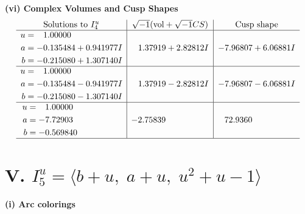 \documentclass[1p]{elsarticle_modified}
\theoremstyle{definition}
\newcommand{\I}{\sqrt{-1}}
\begin{document}
\newpage\flushleft \textbf{(vi) Complex Volumes and Cusp Shapes}
$$\begin{array}{c|c|c}  
\text{Solutions to }I^u_{4}& \I (\text{vol} + \sqrt{-1}CS) & \text{Cusp shape}\\
 \hline 
\begin{aligned}
u &= \phantom{-}1.00000\phantom{ +0.000000I} \\
a &= -0.135484 + 0.941977 I \\
b &= -0.215080 + 1.307140 I\end{aligned}
 & \phantom{-}1.37919 + 2.82812 I & -7.96807 + 6.06881 I \\ \hline\begin{aligned}
u &= \phantom{-}1.00000\phantom{ +0.000000I} \\
a &= -0.135484 - 0.941977 I \\
b &= -0.215080 - 1.307140 I\end{aligned}
 & \phantom{-}1.37919 - 2.82812 I & -7.96807 - 6.06881 I \\ \hline\begin{aligned}
u &= \phantom{-}1.00000\phantom{ +0.000000I} \\
a &= -7.72903\phantom{ +0.000000I} \\
b &= -0.569840\phantom{ +0.000000I}\end{aligned}
 & -2.75839\phantom{ +0.000000I} & \phantom{-}72.9360\phantom{ +0.000000I}\\
 \hline 
 \end{array}$$\newpage\newpage\renewcommand{\arraystretch}{1}
\centering \section*{V. $I^u_{5}= \langle b+u,\;a+u,\;u^2+u-1 \rangle$}
\flushleft \textbf{(i) Arc colorings}\\
\end{document}

